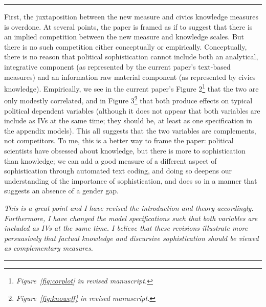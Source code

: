 \rule{\linewidth}{.01cm}

First, the juxtaposition between the new measure and civics knowledge measures is overdone. At several points, the paper is framed as if to suggest that there is an implied competition between the new measure and knowledge scales. But there is no such competition either conceptually or empirically. Conceptually, there is no reason that political sophistication cannot include both an analytical, integrative component (as represented by the current paper's text-based measures) and an information raw material component (as represented by civics knowledge). Empirically, we see in the current paper's Figure 2\footnote{\textit{Figure~\ref{fig:corplot} in revised manuscript.}} that the two are only modestly correlated, and in Figure 3\footnote{\textit{Figure~\ref{fig:knoweff} in revised manuscript.}} that both produce effects on typical political dependent variables (although it does not appear that both variables are include as IVs at the same time; they should be, at least as one specification in the appendix models). This all suggests that the two variables are complements, not competitors. To me, this is a better way to frame the paper: political scientists have obsessed about knowledge, but there is more to sophistication than knowledge; we can add a good measure of a different aspect of sophistication through automated text coding, and doing so deepens our understanding of the importance of sophistication, and does so in a manner that suggests an absence of a gender gap. 

\textit{This is a great point and I have revised the introduction and theory accordingly. Furthermore, I have changed the model specifications such that both variables are included as IVs at the same time. I believe that these revisions illustrate more persuasively that factual knowledge and discursive sophistication should be viewed as complementary measures.}


\rule{\linewidth}{.01cm}


